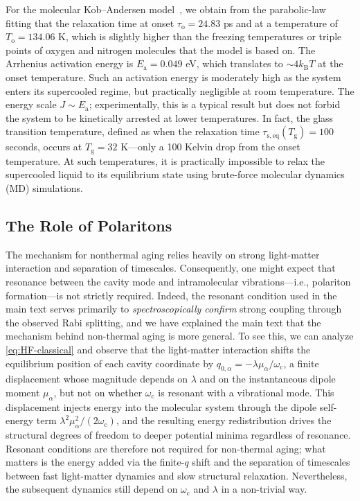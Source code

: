 For the molecular Kob--Andersen model~\cite{kob1995testing}, we obtain from the parabolic-law fitting that the relaxation time at onset $\tau_\mathrm{o} = 24.83$ ps and at a temperature of $T_\mathrm{o} = 134.06$ K, which is slightly higher than the freezing temperatures or triple points of oxygen and nitrogen molecules that the model is based on.\cite{Stewart1991Oxygen,Lemmon2000Air}
The Arrhenius activation energy is $E_\mathrm{a} = 0.049$ eV, which translates to $\sim 4 k_\mathrm{B} T$ at the onset temperature. 
Such an activation energy is moderately high as the system enters its supercooled regime, but practically negligible at room temperature. 
The energy scale $J \sim E_\mathrm{a}$; experimentally, this is a typical result but does not forbid the system to be kinetically arrested at lower temperatures.\cite{Elmatad2009CorrespondingStates}
In fact, the glass transition temperature, defined as when the relaxation time $\tau_\mathrm{s,eq}(T_\mathrm{g}) = 100$ seconds, occurs at $T_\mathrm{g} = 32$ K---only a 100 Kelvin drop from the onset temperature. At such temperatures, it is practically impossible to relax the supercooled liquid to its equilibrium state using brute-force molecular dynamics (MD) simulations.



\subsection{The Role of Polaritons} \label{app:offres}

The mechanism for nonthermal aging relies heavily on strong light-matter interaction and separation of timescales.
Consequently, one might expect that resonance between the cavity mode and intramolecular vibrations---i.e., polariton formation---is not strictly required. Indeed, the resonant condition used in the main text serves primarily to \emph{spectroscopically confirm} strong coupling through the observed Rabi splitting, and we have explained the main text that the mechanism behind non-thermal aging is more general. To see this, we can analyze \cref{eq:HF-classical} and observe that the light-matter interaction shifts the equilibrium position of each cavity coordinate by $q_{0,\alpha} = -\lambda \mu_\alpha / \omega_\mathrm{c}$, a finite displacement whose magnitude depends on $\lambda$ and on the instantaneous dipole moment $\mu_\alpha$, but not on whether $\omega_\mathrm{c}$ is resonant with a vibrational mode. This displacement injects energy into the molecular system through the dipole self-energy term $\lambda^2 \mu_\alpha^2 / (2\omega_\mathrm{c})$, and the resulting energy redistribution drives the structural degrees of freedom to deeper potential minima regardless of resonance. Resonant conditions are therefore not required for non-thermal aging; what matters is the energy added via the finite-$q$ shift and the separation of timescales between fast light-matter dynamics and slow structural relaxation. Nevertheless, the subsequent dynamics still depend on $\omega_\mathrm{c}$ and $\lambda$ in a non-trivial way.

